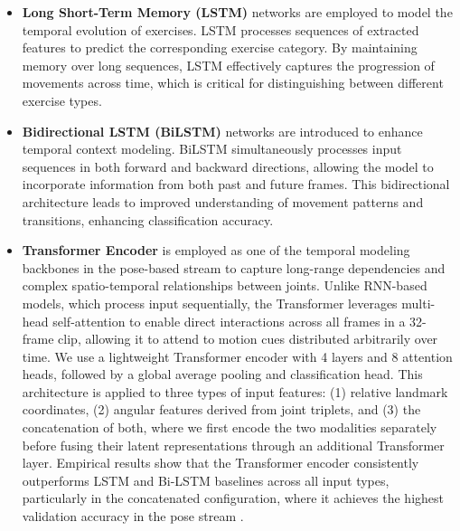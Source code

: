 \documentclass[runningheads]{llncs}
\begin{document}
\begin{itemize}
    
\item  \textbf{Long Short-Term Memory (LSTM)} networks are employed to model the temporal evolution of exercises. LSTM processes sequences of extracted features to predict the corresponding exercise category. By maintaining memory over long sequences, LSTM effectively captures the progression of movements across time, which is critical for distinguishing between different exercise types.	\cite{hochreiter1997long}

\item \textbf{Bidirectional LSTM (BiLSTM)} networks are introduced to enhance temporal context modeling. BiLSTM simultaneously processes input sequences in both forward and backward directions, allowing the model to incorporate information from both past and future frames. This bidirectional architecture leads to improved understanding of movement patterns and transitions, enhancing classification accuracy.	\cite{graves2005}

\item \textbf{Transformer Encoder} is employed as one of the temporal modeling backbones in the pose-based stream to capture long-range dependencies and complex spatio-temporal relationships between joints. Unlike RNN-based models, which process input sequentially, the Transformer leverages multi-head self-attention to enable direct interactions across all frames in a 32-frame clip, allowing it to attend to motion cues distributed arbitrarily over time. We use a lightweight Transformer encoder with 4 layers and 8 attention heads, followed by a global average pooling and classification head. This architecture is applied to three types of input features: (1) relative landmark coordinates, (2) angular features derived from joint triplets, and (3) the concatenation of both, where we first encode the two modalities separately before fusing their latent representations through an additional Transformer layer. Empirical results show that the Transformer encoder consistently outperforms LSTM and Bi-LSTM baselines across all input types, particularly in the concatenated configuration, where it achieves the highest validation accuracy in the pose stream \cite{plizzari2021sttr}.


\end{itemize}
\end{document}
